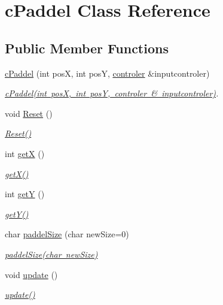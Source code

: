 \hypertarget{classc_paddel}{}\section{c\+Paddel Class Reference}
\label{classc_paddel}
\subsection*{Public Member Functions}
\begin{DoxyCompactItemize}
\item 
\mbox{\hyperlink{classc_paddel_ac907920de815a71e07e129e511f13db4}{c\+Paddel}} (int posX, int posY, \mbox{\hyperlink{classcontroler}{controler}} \&inputcontroler)
\begin{DoxyCompactList}\small\item\em \mbox{\hyperlink{classc_paddel_ac907920de815a71e07e129e511f13db4}{c\+Paddel(int pos\+X, int pos\+Y, controler \& inputcontroler)}}. \end{DoxyCompactList}\item 
void \mbox{\hyperlink{classc_paddel_a4bdcfa64ad3713e749574894d45a8d3b}{Reset}} ()
\begin{DoxyCompactList}\small\item\em \mbox{\hyperlink{classc_paddel_a4bdcfa64ad3713e749574894d45a8d3b}{Reset()}} \end{DoxyCompactList}\item 
int \mbox{\hyperlink{classc_paddel_aaa833a367eab3cc275d7b67b4c3b68e4}{getX}} ()
\begin{DoxyCompactList}\small\item\em \mbox{\hyperlink{classc_paddel_aaa833a367eab3cc275d7b67b4c3b68e4}{get\+X()}} \end{DoxyCompactList}\item 
int \mbox{\hyperlink{classc_paddel_a96cd3a3c7f5678b7e5f8f4eaca271ba2}{getY}} ()
\begin{DoxyCompactList}\small\item\em \mbox{\hyperlink{classc_paddel_a96cd3a3c7f5678b7e5f8f4eaca271ba2}{get\+Y()}} \end{DoxyCompactList}\item 
char \mbox{\hyperlink{classc_paddel_ab291cc9d81b3d169d11fba7d7b57186d}{paddel\+Size}} (char new\+Size=0)
\begin{DoxyCompactList}\small\item\em \mbox{\hyperlink{classc_paddel_ab291cc9d81b3d169d11fba7d7b57186d}{paddel\+Size(char new\+Size)}} \end{DoxyCompactList}\item 
void \mbox{\hyperlink{classc_paddel_a0ef466b341239bf42708ec3e64e942b5}{update}} ()
\begin{DoxyCompactList}\small\item\em \mbox{\hyperlink{classc_paddel_a0ef466b341239bf42708ec3e64e942b5}{update()}} \end{DoxyCompactList}\end{DoxyCompactItemize}


